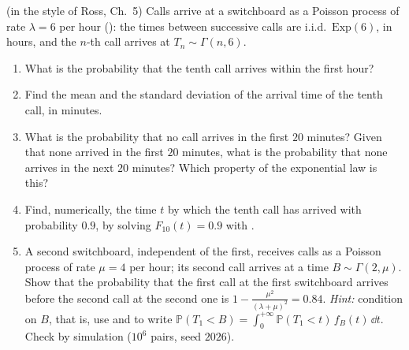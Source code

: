 \begin{exercise}\label{ex:tr-arrivals}
\medium (in the style of Ross, Ch.~5) Calls arrive at a switchboard as a Poisson process of rate
$\lambda=6$ per hour (): the times between successive calls are
i.i.d.\ $\mathrm{Exp}(6)$, in hours, and the $n$-th call arrives at $T_n\sim\Gamma(n,6)$.
\begin{enumerate}[label=(\alph*)]
  \item What is the probability that the tenth call arrives within the first hour?
  \item Find the mean and the standard deviation of the arrival time of the tenth call, in minutes.
  \item What is the probability that no call arrives in the first $20$ minutes? Given that none
    arrived in the first $20$ minutes, what is the probability that none arrives in the next $20$
    minutes? Which property of the exponential law is this?
  \item Find, numerically, the time $t$ by which the tenth call has arrived with probability
    $0.9$, by solving $F_{10}(t)=0.9$ with .
  \item A second switchboard, independent of the first, receives calls as a Poisson process of
    rate $\mu=4$ per hour; its second call arrives at a time $B\sim\Gamma(2,\mu)$. Show that the
    probability that the first call at the first switchboard arrives before the second call at the
    second one is $1-\frac{\mu^2}{(\lambda+\mu)^2}=0.84$. \emph{Hint:} condition on $B$, that is, use
     and  to write
    $\mathbb P(T_1<B)=\int_0^{+\infty}\mathbb P(T_1<t)\,f_B(t)\,\dd t$. Check by simulation
    ($10^6$ pairs, seed $2026$).
\end{enumerate}
\end{exercise}
